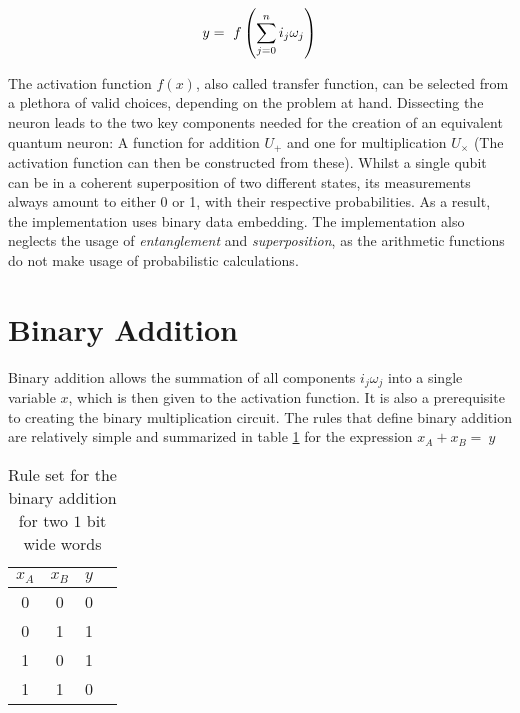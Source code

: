 \begin{equation}
    \centering
    y =\ f\left(\sum_{j = 0}^n i_j\omega_j\right)
    \label{equation:computation_neuron}
\end{equation}

\newpage

The activation function $f(x)$, also called transfer function, can be selected from a plethora of valid choices\cite{szandala_review_2021}, depending on the problem at hand. Dissecting the neuron leads to the two key components needed for the creation of an equivalent quantum neuron: A function for addition $U_{+}$ and one for multiplication $U_{\times}$ (The activation function can then be constructed from these). Whilst a single qubit can be in a coherent superposition of two different states\cite{nielsen_quantum_2010}, its measurements always amount to either 0 or 1, with their respective probabilities. As a result, the implementation uses binary data embedding. The implementation also neglects the usage of \emph{entanglement} and \emph{superposition}, as the arithmetic functions do not make usage of probabilistic calculations.

\section{Binary Addition}\label{chapter:binary_addition}

Binary addition allows the summation of all components $i_j\omega_j$ into a single variable $x$, which is then given to the activation function. It is also a prerequisite to creating the binary multiplication circuit. The rules that define binary addition are relatively simple and summarized in table \ref{table:binary_addition_rules} for the expression $x_A + x_B =\ y$\\
\begin{table}[!h]
\centering
\begin{tabular}{|c|c|c|c|}
\hline
$x_A$ & $x_B$ & $y$ \\ \hline
0    & 0    & 0  \\ \hline
0    & 1    & 1  \\ \hline
1    & 0    & 1  \\ \hline
1    & 1    & 0  \\ \hline
\end{tabular}
\caption{Rule set for the binary addition for two $1$ bit wide words}
\label{table:binary_addition_rules}
\end{table}

